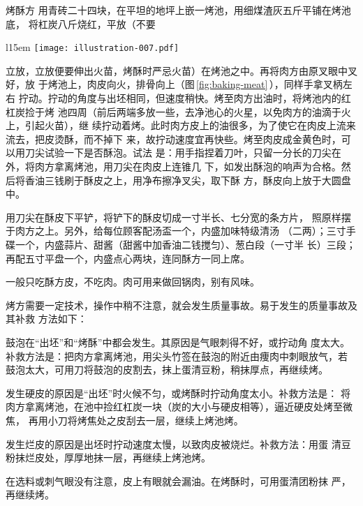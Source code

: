 \begin{recipe}{烤酥方}
\step[烤酥] 用青砖二十四块，在平坦的地坪上嵌一烤池，用细煤渣灰五斤平铺在烤池底，
将杠炭八斤烧红，平放（不要
\begin{wrapfigure}[13]{l}{15em}%
\centering%
\vspace{-.5\baselineskip}%
\texttt{[image: illustration-007.pdf]}%
\vspace{.1875\baselineskip}%
\caption{烤酥}
\label{fig:baking-meat}
\end{wrapfigure}
%
立放，立放便要伸出火苗，烤酥时严忌火苗）在烤池之中。再将肉方由原叉眼中叉好，放
于烤池上，肉皮向火，排骨向上（图\,\ref{fig:baking-meat}\,），同样手拿叉柄左右
拧动。拧动的角度与出坯相同，但速度稍快。烤至肉方出油时，将烤池内的红杠炭捡于烤
池四周（前后两端多放一些，去净池心的火星，以免肉方的油滴于火上，引起火苗），继
续拧动着烤。此时肉方皮上的油很多，为了使它在肉皮上流来流去，把皮烫酥，而不掉下
来，故拧动速度宜再快些。烤至肉皮成金黄色时，可以用刀尖试验一下是否酥泡。试法
是：用手指捏着刀叶，只留一分长的刀尖在外，将肉方拿离烤池，用刀尖在肉皮上连锥几
下，如发出酥泡的响声为合格。然后将香油三钱刷于酥皮之上，用净布擦净叉尖，取下酥
方，酥皮向上放于大圆盘中。

\step[铲皮上席] 用刀尖在酥皮下平铲，将铲下的酥皮切成一寸半长、七分宽的条方片，
照原样摆于肉方之上。另外，给每位顾客配汤盃一个，内盛加味特级清汤\footnotemark
（二两）；三寸手碟一个，内盛蒜片、甜酱（甜酱中加香油二钱搅匀）、葱白段（一寸半
长）三段；再配五寸平盘一个，内盛点心两块，连同酥方一同上席。

\step[吃法] 一般只吃酥方皮，不吃肉。肉可用来做回锅肉，别有风味。

\suggestion

烤方需要一定技术，操作中稍不注意，就会发生质量事故。易于发生的质量事故及其补救
方法如下：

\hint[方皮鼓泡] 鼓泡在“出坯”和“烤酥”中都会发生。其原因是气眼刺得不好，或拧动角
度太大。补救方法是：把肉方拿离烤池，用尖头竹签在鼓泡的附近由痩肉中刺眼放气，若
鼓泡太大，可用刀将鼓泡的皮割去，抹上蛋清豆粉，稍抹厚点，再继续烤。

\hint[硬皮] 发生硬皮的原因是“出坯”时火候不匀，或烤酥时拧动角度太小。补救方法是：
将肉方拿离烤池，在池中捡红杠炭一块（炭的大小与硬皮相等），逼近硬皮处烤至微焦，
再用小刀将烤焦处之皮刮去一层，继续上烤池烤。

\hint[烂皮] 发生烂皮的原因是出坯时拧动速度太慢，以致肉皮被烧烂。补救方法：用蛋
清豆粉抹烂皮处，厚厚地抹一层，再继续上烤池烤。

\hint[漏油] 在选料或刺气眼没有注意，皮上有眼就会漏油。在烤酥时，可用蛋清团粉抹
严，再继续烤。


\end{recipe}
